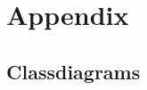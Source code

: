 %
\chapter{Appendix}
\label{sec:appendix}


\section{Classdiagrams}
\label{sec:appendix:classdiagrams}






